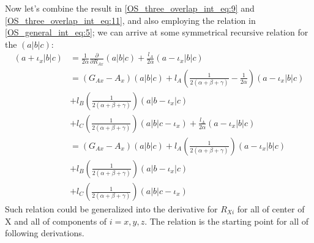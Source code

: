 Now let's combine the result in \ref{OS_three_overlap_int_eq:9} and \ref{OS_three_overlap_int_eq:11},
and also employing the relation in \ref{OS_general_int_eq:5}; we can arrive at some symmetrical
recursive relation for the $(a|b|c)$:
\begin{equation}
 \begin{split}
 (a+\iota_{x}|b|c) &= \frac{1}{2\alpha}\frac{\partial }{\partial R_{Ax}}(a|b|c) 
+ \frac{l_{A}}{2\alpha}(a-\iota_{x}|b|c) \\
&= (G_{Ax} - A_{x})(a|b|c) + 
l_{A}\left(\frac{1}{2(\alpha+\beta+\gamma)} -\frac{1}{2\alpha}\right)(a-\iota_{x}|b|c) \\
&+ l_{B}\left(\frac{1}{2(\alpha+\beta+\gamma)}\right)(a|b-\iota_{x}|c)  \\
&+ l_{C}\left(\frac{1}{2(\alpha+\beta+\gamma)}\right)(a|b|c-\iota_{x}) +  
\frac{l_{A}}{2\alpha}(a-\iota_{x}|b|c) \\
&= (G_{Ax} - A_{x})(a|b|c) + 
l_{A}\left(\frac{1}{2(\alpha+\beta+\gamma)}\right)(a-\iota_{x}|b|c) \\
&+ 
l_{B}\left(\frac{1}{2(\alpha+\beta+\gamma)}\right)(a|b-\iota_{x}|c) \\
&+
l_{C}\left(\frac{1}{2(\alpha+\beta+\gamma)}\right)(a|b|c-\iota_{x}) 
 \end{split}
\label{OS_three_overlap_int_eq:12}
\end{equation}
Such relation could be generalized into the derivative for $R_{Xi}$ for all of 
center of X and all of components of $i=x,y,z$. The relation is the starting point for 
all of following derivations.

